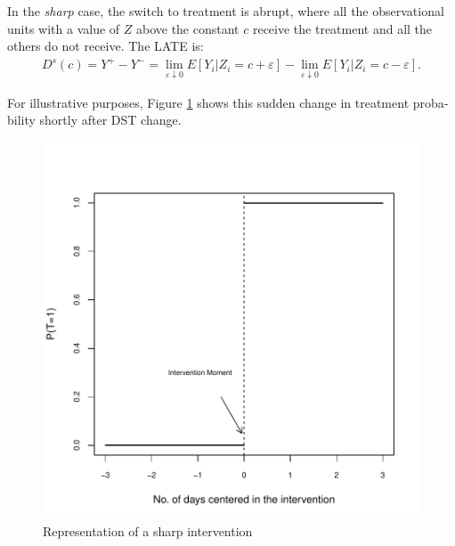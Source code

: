 \documentclass[12pt,openright,oneside,a4paper,english,french,spanish]{abntex2}
\numberwithin{table}{section} %
\numberwithin{figure}{section} %
\begin{document}
\begin{otherlanguage}{english}
In the \textit{sharp} case, the switch to treatment is abrupt, where all the observational units with a value of $Z$ above the constant $c$ receive the treatment and all the others do not receive. The LATE is:
\begin{align*}
D^{s}(c)=Y^{+}-Y^{-}=\lim_{\varepsilon\downarrow 0}E[Y_i|Z_i=c+\varepsilon]-\lim_{\varepsilon\downarrow 0}E[Y_i|Z_i=c-\varepsilon].
\end{align*}

For illustrative purposes, Figure \ref{fig:repre_inter_sharp} shows this sudden change in treatment probability shortly after DST change.

\begin{figure}[H]
\begin{center}
\includegraphics{TESE_DE_DOUTORADO_RENAN_FINAL-plot_exemp_inter}
\end{center}
\caption{Representation of a sharp intervention}
\label{fig:repre_inter_sharp}
\end{figure}


\end{otherlanguage}
\end{document}
